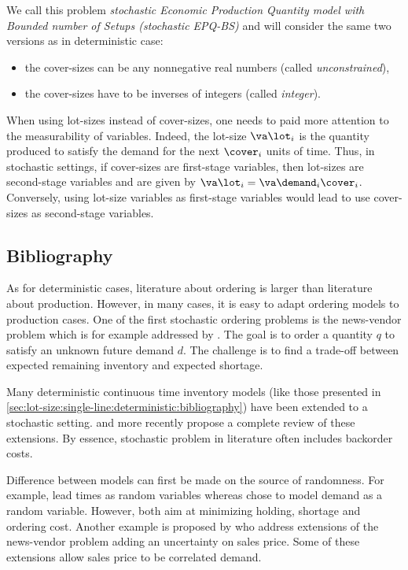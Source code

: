 We call this problem \emph{stochastic Economic Production Quantity model with Bounded number of Setups (stochastic EPQ-BS)} and will consider the same two versions as in deterministic case:
\begin{itemize}
  \item the cover-sizes can be any nonnegative real numbers (called \emph{unconstrained}),
  \item the cover-sizes have to be inverses of integers (called \emph{integer}).
\end{itemize}


\medskip


When using lot-sizes instead of cover-sizes, one needs to paid more attention to the measurability of variables.
Indeed, the lot-size $\va\lot_i$ is the quantity produced to satisfy the demand for the next $\cover_i$ units of time.
Thus, in stochastic settings, if cover-sizes are first-stage variables, then lot-sizes are second-stage variables and are given by $\va\lot_i=\va\demand_i\cover_i$.
Conversely, using lot-size variables as first-stage variables would lead to use cover-sizes as second-stage variables.



\subsection{Bibliography}
\label{sec:lot-size:single-line:stochastic:bibliography}


As for deterministic cases, literature about ordering is larger than literature about production.
However, in many cases, it is easy to adapt ordering models to production cases.
One of the first stochastic ordering problems is the news-vendor problem which is for example addressed by \citet{Edgeworth88}.
The goal is to order a quantity $q$ to satisfy an unknown future demand $d$.
The challenge is to find a trade-off between expected remaining inventory and expected shortage.


Many deterministic continuous time inventory models (like those presented in \cref{sec:lot-size:single-line:deterministic:bibliography}) have been extended to a stochastic setting.
\citet{Candace1995} and more recently \citet{Ziukov2015} propose a complete review of these extensions.
By essence, stochastic problem in literature often includes backorder costs.


\medskip


Difference between models can first be made on the source of randomness.
For example, \citet{Friedman1984} lead times as random variables whereas \citet{Eynan2007} chose to model demand as a random variable.
However, both aim at minimizing holding, shortage and ordering cost.
Another example is proposed by \citet{Sana2011} who address extensions of the news-vendor problem adding an uncertainty on sales price.
Some of these extensions allow sales price to be correlated demand.


